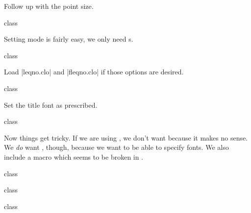 \documentclass{skdoc}
\begin{document}
	\begin{macro}{\@ptsize}
	Follow up with the point size.
\begin{MacroCode}{class}
\end{MacroCode}
	\end{macro}

	Setting  mode is fairly easy, we only need
	s.
\begin{MacroCode}{class}
\ifskrapport@draft
	\setlength\overfullrule{5pt}
\else
	\setlength\overfullrule{0pt}
\fi
\end{MacroCode}

	Load |leqno.clo| and |fleqno.clo| if those options are desired.
\begin{MacroCode}{class}
\ifskrapport@leqno\fi
\ifskrapport@fleqn\fi
\end{MacroCode}

	\begin{macro*}{\@titstyle}
	Set the title font as prescribed.
\begin{MacroCode}{class}
\end{MacroCode}
	\end{macro*}

	Now things get tricky. If we are using , we don't
	want  because it makes no sense. We \emph{do} want
	, though, because we want to be able to specify
	fonts. We also include a  macro which seems to
	be broken in .
\begin{MacroCode}{class}
\ifxetex
  \RequirePackage[quiet]{fontspec}
\end{MacroCode}
	\begin{macro}{\nobreakspace}
\begin{MacroCode}{class}
	\DeclareRobustCommand\nobreakspace{\leavevmode\nobreak\space}
\end{MacroCode}
	\end{macro}
\begin{MacroCode}{class}
\else
  \RequirePackage[T1]{fontenc}	
\fi
\end{MacroCode}
\end{document}
